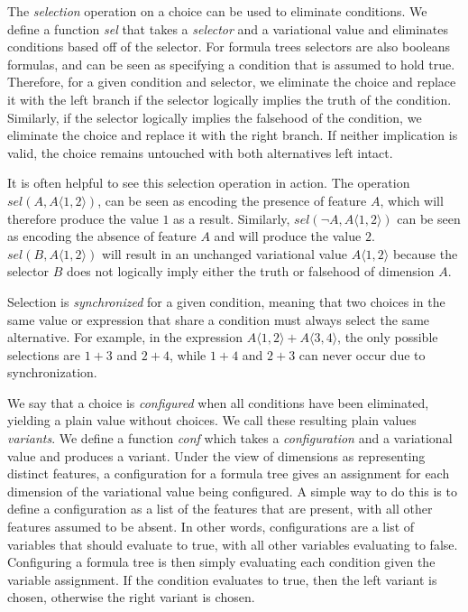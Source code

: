 \documentclass[letterpaper,10pt,onecolumn]{article}
\newcommand{\tagtree}[3]{#1 \langle #2, #3 \rangle}
\begin{document}
The \emph{selection} operation on a choice can be used to eliminate conditions. We define a function
\emph{sel} that takes a \emph{selector} and a variational value and eliminates conditions based off
of the selector. For formula trees selectors are also booleans formulas, and can be seen as specifying
a condition that is assumed to hold true. Therefore, for a given condition and
selector, we eliminate the choice and replace it with the left branch if the selector logically implies
the truth of the condition. Similarly, if the selector logically implies the falsehood of the condition, we eliminate the choice
and replace it with the right branch. If neither implication is valid, the choice remains untouched with
both alternatives left intact.

It is often helpful to see this selection operation in action. The operation
$\mathit{sel}(A,\tagtree{A}{1}{2})$, can be seen as encoding the presence of feature $A$, which
will therefore produce the value $1$ as a result. Similarly, $\mathit{sel}(\neg A,\tagtree{A}{1}{2})$ can be seen as encoding the absence of feature $A$ and will
produce the value $2$. $\mathit{sel}(B,\tagtree{A}{1}{2})$ will result in an unchanged variational
value $\tagtree{A}{1}{2}$ because the selector $B$ does not logically imply either the truth or falsehood
of dimension $A$.

Selection is \emph{synchronized} for a given
condition, meaning that two choices in the same value or expression that share a condition must always
select the same alternative. For example, in the expression $\tagtree{A}{1}{2}+\tagtree{A}{3}{4}$,
the only possible selections are $1+3$ and $2+4$, while $1+4$ and $2+3$ can never occur due
to synchronization.

We say that a choice is \emph{configured} when all conditions
have been eliminated, yielding a plain value without choices. We call these resulting plain values
\emph{variants}. We define a function \emph{conf} which takes a
\emph{configuration} and a variational value and produces a variant. Under the view of dimensions as representing distinct features, a configuration for a formula tree gives
an assignment for each dimension of the variational value being configured.
A simple way to do this is to define a configuration as a list of the features that are present, with all
other features assumed to be absent. In other words, configurations are a list of variables that should
evaluate to true, with all other variables evaluating to false. Configuring a formula tree is then simply evaluating
each condition given the variable assignment. If the condition evaluates to true, then the left variant
is chosen, otherwise the right variant is chosen.
\end{document}
